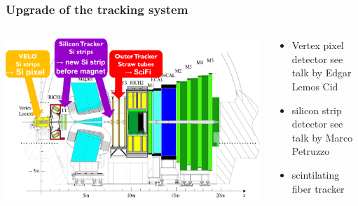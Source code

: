 \documentclass[table,xcolor=dvipsnames,professionalfonts]{beamer}
\begin{document}
    \begin{frame}
      \frametitle{Upgrade of the tracking system}
      \begin{columns}
        \begin{column}{.7\textwidth}
          \includegraphics[width=\textwidth]{./LHCb2.pdf}
        \end{column}
        \begin{column}{.3\textwidth}
            \begin{itemize}
              \item Vertex pixel detector
                \newline see talk by Edgar Lemos Cid
              \item silicon strip detector
                \newline see talk by Marco Petruzzo
              \item scintilating fiber tracker
            \end{itemize}
          \end{column}
        \end{columns}
      \end{frame}
\end{document}
